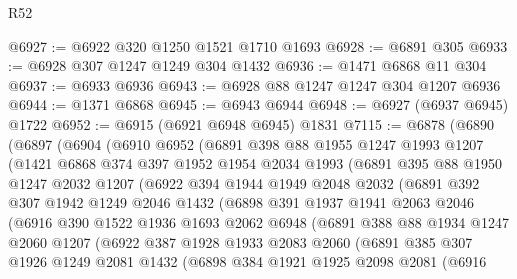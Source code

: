 \begin{lexlean}{R52}
\begin{coremodule}
@6927 := @6922 @320 @1250 @1521 @1710 @1693
@6928 := @6891 @305
@6933 := @6928 @307 @1247 @1249 @304 @1432
@6936 := @1471 @6868 @11 @304
@6937 := @6933 @6936
@6943 := @6928 @88 @1247 @1247 @304 @1207 @6936
@6944 := @1371 @6868
@6945 := @6943 @6944
@6948 := @6927 (@6937 @6945) @1722
@6952 := @6915 (@6921 @6948 @6945) @1831
@7115 := @6878
    (@6890
      (@6897
        (@6904
          (@6910
            @6952
            (@6891
              @398
              @88
              @1955
              @1247
              @1993
              @1207
              (@1421
                @6868
                @374
                @397
                @1952
                @1954
                @2034
                @1993
                (@6891
                  @395
                  @88
                  @1950
                  @1247
                  @2032
                  @1207
                  (@6922
                    @394
                    @1944
                    @1949
                    @2048
                    @2032
                    (@6891
                      @392
                      @307
                      @1942
                      @1249
                      @2046
                      @1432
                      (@6898
                        @391
                        @1937
                        @1941
                        @2063
                        @2046
                        (@6916
                          @390
                          @1522
                          @1936
                          @1693
                          @2062
                          @6948
                          (@6891
                            @388
                            @88
                            @1934
                            @1247
                            @2060
                            @1207
                            (@6922
                              @387
                              @1928
                              @1933
                              @2083
                              @2060
                              (@6891
                                @385
                                @307
                                @1926
                                @1249
                                @2081
                                @1432
                                (@6898
                                  @384
                                  @1921
                                  @1925
                                  @2098
                                  @2081
                                  (@6916

\end{coremodule}
\end{lexlean}
